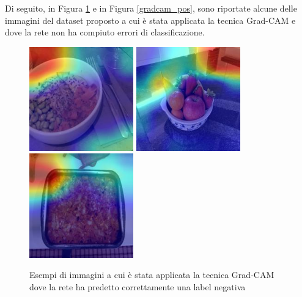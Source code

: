 Di seguito, in Figura \ref{gradcam_neg} e in Figura \ref{gradcam_pos}, sono riportate alcune delle immagini del dataset proposto a cui è stata applicata la tecnica Grad-CAM e dove la rete non ha compiuto errori di classificazione.

\begin{figure}[H]
\centering
\includegraphics[height=45mm]{images/gradcam1.jpg}
\quad
\includegraphics[height=45mm]{images/gradcam23.jpg}
\quad
\includegraphics[height=45mm]{images/gradcam14.jpg}
\quad
\caption{Esempi di immagini a cui è stata applicata la tecnica Grad-CAM dove la rete ha predetto correttamente una label negativa}
\label{gradcam_neg}
\end{figure}

